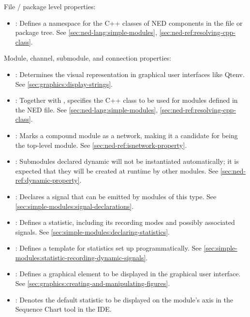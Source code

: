 File / package level properties:

\begin{itemize}
  \item {}: Defines a namespace for the C++ classes of
    NED components in the file or package tree. See
    \ref{sec:ned-lang:simple-modules}, \ref{sec:ned-ref:resolving-cpp-class}.
\end{itemize}

Module, channel, submodule, and connection properties:

\begin{itemize}
  \item {}: Determines the visual representation in
    graphical user interfaces like Qtenv. See
    \ref{sec:graphics:display-strings}.
  \item {}: Together with ,
    specifies the C++ class to be used for modules defined in the NED file. See
    \ref{sec:ned-lang:simple-modules}, \ref{sec:ned-ref:resolving-cpp-class}.
  \item {}: Marks a compound module as a network, making it a
    candidate for being the top-level module. See
    \ref{sec:ned-ref:isnetwork-property}.
  \item {}: Submodules declared dynamic will not be instantiated
    automatically; it is expected that they will be created at runtime by other
    modules. See \ref{sec:ned-ref:dynamic-property}.
  \item {}: Declares a signal that can be
    emitted by modules of this type. See
    \ref{sec:simple-modules:signal-declarations}.
  \item {}: Defines a statistic, including its
    recording modes and possibly associated signals. See
    \ref{sec:simple-modules:declaring-statistics}.
  \item {}: Defines a template for
    statistics set up programmatically. See
    \ref{sec:simple-modules:statistic-recording-dynamic-signals}.
  \item {}: Defines a graphical element to be
    displayed in the graphical user interface. See
    \ref{sec:graphics:creating-and-manipulating-figures}.
  \item {}: Denotes the default statistic to be
    displayed on the module's axis in the Sequence Chart tool in the IDE.
\end{itemize}

